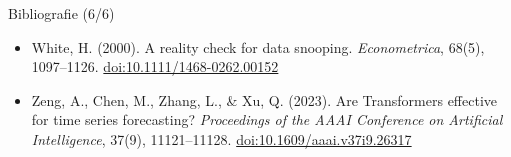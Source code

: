 \begin{frame}{Bibliografie (6/6)}
\begin{itemize}
    \item White, H. (2000). A reality check for data snooping. \textit{Econometrica}, 68(5), 1097--1126. \href{https://doi.org/10.1111/1468-0262.00152}{doi:10.1111/1468-0262.00152}
    \item Zeng, A., Chen, M., Zhang, L., \& Xu, Q. (2023). Are Transformers effective for time series forecasting? \textit{Proceedings of the AAAI Conference on Artificial Intelligence}, 37(9), 11121--11128. \href{https://doi.org/10.1609/aaai.v37i9.26317}{doi:10.1609/aaai.v37i9.26317}
\end{itemize}
\end{frame}



